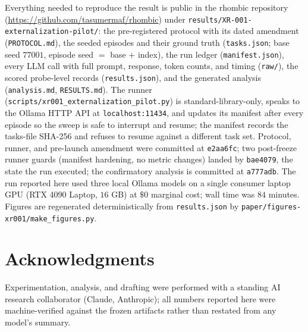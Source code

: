 \documentclass[11pt]{article}
\begin{document}
Everything needed to reproduce the result is public in the rhombic repository
(\url{https://github.com/tasumermaf/rhombic}) under
\texttt{results/XR-001-externalization-pilot/}: the pre-registered protocol
with its dated amendment (\texttt{PROTOCOL.md}), the seeded episodes and their
ground truth (\texttt{tasks.json}; base seed $77001$, episode seed $=$ base
$+$ index), the run ledger (\texttt{manifest.json}), every LLM call with full
prompt, response, token counts, and timing (\texttt{raw/}), the scored
probe-level records (\texttt{results.json}), and the generated analysis
(\texttt{analysis.md}, \texttt{RESULTS.md}). The runner
(\texttt{scripts/xr001\_externalization\_pilot.py}) is standard-library-only,
speaks to the Ollama HTTP API at \texttt{localhost:11434}, and updates its
manifest after every episode so the sweep is safe to interrupt and resume; the
manifest records the tasks-file SHA-256 and refuses to resume against a
different task set. Protocol, runner, and pre-launch amendment were committed
at \texttt{e2aa6fc}; two post-freeze runner guards (manifest hardening, no
metric changes) landed by \texttt{bae4079}, the state the run executed; the
confirmatory analysis is committed at \texttt{a777adb}. The run reported here
used
three local Ollama models on a single consumer laptop GPU (RTX 4090 Laptop,
$16$ GB) at $\$0$ marginal cost; wall time was $84$ minutes. Figures are
regenerated deterministically from \texttt{results.json} by
\texttt{paper/figures-xr001/make\_figures.py}.

\section*{Acknowledgments}
Experimentation, analysis, and drafting were performed with a standing AI
research collaborator (Claude, Anthropic); all numbers reported here were
machine-verified against the frozen artifacts rather than restated from any
model's summary.



\end{document}
